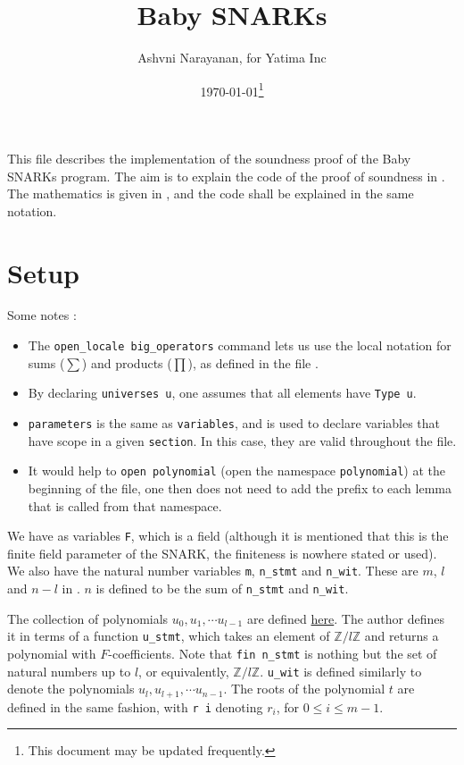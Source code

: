 \documentclass{article}
\title{Baby SNARKs}
\author{Ashvni Narayanan, for Yatima Inc}
\date{\today\footnote{This document may be updated frequently.}}
\theoremstyle{definition}
\theoremstyle{remark}
\begin{document}
\maketitle

This file describes the implementation of the soundness proof of the Baby SNARKs program. The aim is to explain the code of the proof of soundness in \cite{code}. The mathematics is given in \cite{main}, and the code shall be explained in the same notation.

\section{Setup}
Some notes :
\begin{itemize}
  \item The \texttt{open\_locale big\_operators} command lets us use the local notation for sums ($\sum$) and products ($\prod$), as defined in the file \cite{big_operators}.
  \item By declaring \texttt{universes u}, one assumes that all elements have \texttt{Type u}.
  \item \texttt{parameters} is the same as \texttt{variables}, and is used to declare variables that have scope in a given \texttt{section}. In this case, they are valid throughout the file.
  \item It would help to \texttt{open polynomial} (open the namespace \texttt{polynomial}) at the beginning of the file, one then does not need to add the prefix to each lemma that is called from that namespace.
\end{itemize}

We have as variables \texttt{F}, which is a field (although it is mentioned that this is the finite field parameter of the SNARK, the finiteness is nowhere stated or used). We also 
have the natural number variables \texttt{m}, \texttt{n\_stmt} and \texttt{n\_wit}. These are $m$, $l$ and $n - l$ in \cite{main}. $n$ is defined to be the sum of \texttt{n\_stmt} and \texttt{n\_wit}. 

The collection of polynomials $u_0, u_1, \cdots u_{l - 1}$ are defined \href{https://github.com/BoltonBailey/formal-snarks-project/blob/7fd9cd122f5887f88f6a706b4f2a68a7153c7381/src/snarks/babysnark/knowledge_soundness.lean#L59}{here}. 
The author defines it in terms of a function \texttt{u\_stmt}, which takes an element of $\mathbb{Z}/l \mathbb{Z}$ and returns a polynomial with $F$-coefficients. Note that \texttt{fin n\_stmt} is nothing but the set of natural numbers 
up to $l$, or equivalently, $\mathbb{Z}/l \mathbb{Z}$. \texttt{u\_wit} is defined similarly to denote the polynomials $u_l, u_{l + 1}, \cdots u_{n - 1}$. The roots of the polynomial $t$ are defined in the same fashion, with 
\texttt{r i} denoting $r_i$, for $0 \le i \le m - 1$. 
\end{document}
